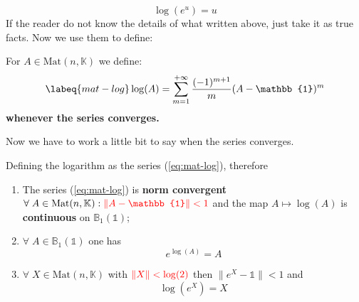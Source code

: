 \documentclass[../main.tex]{subfiles}
\begin{document}
\[
\log(e^u)=u
\]
If the reader do not know the details of what written above, just take it as true facts. Now we use them to define:
\begin{definition}
For $A\in\text{Mat}(n,\mathbb{K})$ we define:
\begin{equation}\labeq{mat-log}
\log(A)=\sum_{m=1}^{+\infty}\frac{(-1)^{m+1}}{m}(A-\mathbb{1})^m
\end{equation}
\textbf{whenever the series converges.}
\end{definition}
Now we have to work a little bit to say when the series converges.
\begin{theorem}
Defining the logarithm as the series (\ref{eq:mat-log}), therefore
\renewcommand{\labelenumi}{\Alph{enumi})}
\begin{enumerate}
    \item The series (\ref{eq:mat-log}) is \textbf{norm convergent} $\forall\; A\in\text{Mat}(n,\mathbb{K}): {\color{red}\lVert A-\mathbb{1}\rVert<1}$ and the map $A\mapsto\log(A)$ is \textbf{continuous} on $\mathbb{B}_1(\mathbb{1})$;
    \item $\forall\;A\in\mathbb{B}_1(\mathbb{1})$ one has 
    \[
    e^{\log(A)}=A
    \]
    \item $\forall\;X\in\text{Mat}(n,\mathbb{K})$ with ${\color{red}\lVert X\rVert<\log(2)}$ then $\lVert e^X-\mathbb{1}\rVert<1$ and 
    \[
    \log(e^X)=X
    \]
\end{enumerate}
\end{theorem}
\end{document}
